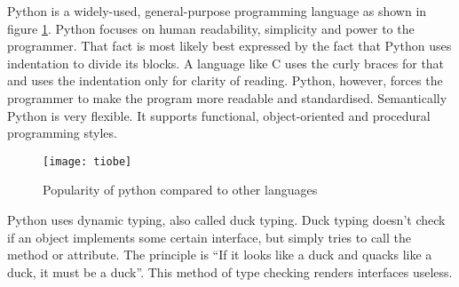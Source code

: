 Python is a widely-used, general-purpose programming language as shown in figure
\ref{python-popularity}. Python focuses on human readability, simplicity and
power to the
programmer.\cite{website:python-zen,website:python-faq-creation-reason} That
fact is most likely best expressed by the fact that Python uses indentation to
divide its blocks. A language like C uses the curly braces for that and uses the
indentation only for clarity of reading. Python, however, forces the programmer
to make the program more readable and standardised. Semantically Python is very
flexible. It supports functional, object-oriented and procedural programming
styles.

\begin{figure}[htp]
\begin{center}
  \texttt{[image: tiobe]}
  \caption[Python popularity]{Popularity of python compared to other
  languages\cite{website:tiobe-index}}
  \label{python-popularity}
\end{center}
\end{figure}

Python uses dynamic typing, also called duck typing. Duck typing doesn't check
if an object implements some certain interface, but simply tries to call the
method or attribute. The principle is ``If it looks like a duck and quacks like
a duck, it must be a duck''.\cite[duck-typing]{website:python-glossary} This
method of type checking renders interfaces useless. 








